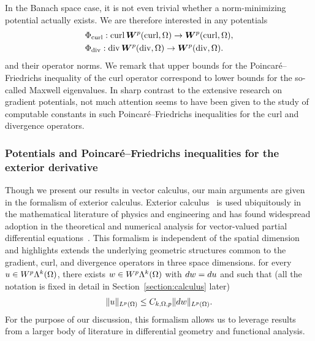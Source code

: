 \documentclass[10pt,a4paper]{article}
\begin{document}
In the Banach space case, it is not even trivial whether a norm-minimizing potential actually exists. 
We are therefore interested in any potentials 
\begin{align}
    &\Phi_{\operatorname{curl}} : \operatorname{curl} \bm{W}^{p}(\operatorname{curl},\Omega) \rightarrow \bm{W}^{p}(\operatorname{curl},\Omega)
    ,
    \\
    &\Phi_{\operatorname{div}} : \operatorname{div} \bm{W}^{p}(\operatorname{div},\Omega) \rightarrow \bm{W}^{p}(\operatorname{div},\Omega)
    .
\end{align}
and their operator norms. We remark that upper bounds for the Poincar\'e--Friedrichs inequality of the curl operator correspond to lower bounds for the so-called Maxwell eigenvalues. 
In sharp contrast to the extensive research on gradient potentials, 
not much attention seems to have been given to the study of computable constants in such Poincar\'e--Friedrichs inequalities for the curl and divergence operators. 




\subsubsection{Potentials and Poincar\'e--Friedrichs inequalities for the exterior derivative}

Though we present our results in vector calculus, our main arguments are given in the formalism of exterior calculus. 
Exterior calculus~\cite{greub1967multilinear,lee2012smooth} is used ubiquitously in the mathematical literature of physics and engineering and has found widespread adoption in the theoretical and numerical analysis for vector-valued partial differential equations~\cite{hiptmair2002finite, gross2004electromagnetic, arnold2006finite, arnold2009geometric, arnold2010finite, demlow2014posteriori, licht2021local, arnold2021complexes}. 
This formalism is independent of the spatial dimension and highlights extends the underlying geometric structures common to the gradient, curl, and divergence operators in three space dimensions.
for every $u \in W^{p}\Lambda^{k}(\Omega)$, there exists $w \in W^{p}\Lambda^{k}(\Omega)$ with $d w = d u$ and such that (all the notation is fixed in detail in Section~\ref{section:calculus} later)
\begin{align} \label{math:intro:exterior:pf} 
    \| u \|_{L^{p}(\Omega)} \leq  C_{k,\Omega,p} \| d w \|_{L^{p}(\Omega)}.
\end{align} 
For the purpose of our discussion, this formalism allows us to leverage results from a larger body of literature in differential geometry and functional analysis. 
\end{document}
